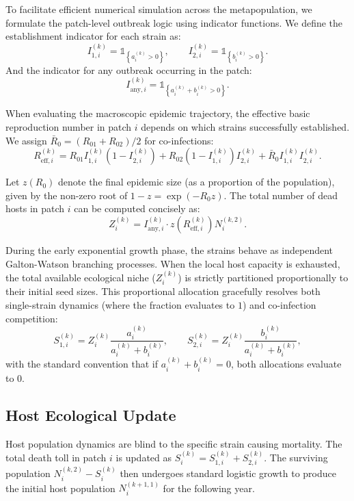 \documentclass[11pt,a4paper]{article}
\begin{document}
To facilitate efficient numerical simulation across the metapopulation, we formulate the patch-level outbreak logic using indicator functions. We define the establishment indicator for each strain as:
\begin{equation}
I_{1,i}^{(k)} = \mathds{1}_{\left\{a_i^{(k)} > 0\right\}}, \qquad I_{2,i}^{(k)} = \mathds{1}_{\left\{b_i^{(k)} > 0\right\}}.
\end{equation}
And the indicator for any outbreak occurring in the patch:
\begin{equation}
I_{\mathrm{any},i}^{(k)} = \mathds{1}_{\left\{a_i^{(k)} + b_i^{(k)} > 0\right\}}.
\end{equation}

When evaluating the macroscopic epidemic trajectory, the effective basic reproduction number in patch $i$ depends on which strains successfully established. We assign $\bar{R}_0 = (R_{01} + R_{02})/2$ for co-infections:
\begin{equation}
R_{\mathrm{eff},i}^{(k)} = R_{01} I_{1,i}^{(k)} \left(1 - I_{2,i}^{(k)}\right) + R_{02} \left(1 - I_{1,i}^{(k)}\right) I_{2,i}^{(k)} + \bar{R}_0 I_{1,i}^{(k)} I_{2,i}^{(k)}.
\end{equation}

Let $z(R_0)$ denote the final epidemic size (as a proportion of the population), given by the non-zero root of $1 - z = \exp(-R_0 z)$. The total number of dead hosts in patch $i$ can be computed concisely as:
\begin{equation}
Z_i^{(k)} = I_{\mathrm{any},i}^{(k)} \cdot z\!\left(R_{\mathrm{eff},i}^{(k)}\right) N_i^{(k,2)}.
\end{equation}

During the early exponential growth phase, the strains behave as independent Galton-Watson branching processes. When the local host capacity is exhausted, the total available ecological niche ($Z_i^{(k)}$) is strictly partitioned proportionally to their initial seed sizes. This proportional allocation gracefully resolves both single-strain dynamics (where the fraction evaluates to $1$) and co-infection competition:
\begin{equation}
S_{1,i}^{(k)} = Z_i^{(k)} \frac{a_i^{(k)}}{a_i^{(k)} + b_i^{(k)}}, \qquad
S_{2,i}^{(k)} = Z_i^{(k)} \frac{b_i^{(k)}}{a_i^{(k)} + b_i^{(k)}},
\end{equation}
with the standard convention that if $a_i^{(k)} + b_i^{(k)} = 0$, both allocations evaluate to $0$.

\subsection{Host Ecological Update}

Host population dynamics are blind to the specific strain causing mortality. The total death toll in patch $i$ is updated as $S_i^{(k)} = S_{1,i}^{(k)} + S_{2,i}^{(k)}$. The surviving population $N_i^{(k,2)} - S_i^{(k)}$ then undergoes standard logistic growth to produce the initial host population $N_i^{(k+1,1)}$ for the following year.
\end{document}
